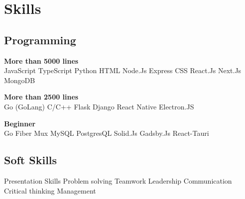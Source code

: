 \documentclass[]{deedy-resume-openfont}
\begin{document}
\begin{minipage}[t]{0.33\textwidth}

\section{Skills}
\subsection{Programming}
\sectionsep
{\bf More than 5000 lines} \\
JavaScript \textbullet{} TypeScript \textbullet{} Python \textbullet{} HTML \textbullet{} Node.Js \textbullet{} Express \textbullet{} CSS \textbullet{} React.Js \textbullet{} Next.Js \textbullet{} MongoDB \\
\sectionsep

{\bf More than 2500 lines} \\
Go (GoLang) \textbullet{} C/C++ \textbullet{} Flask \textbullet{} Django \textbullet{} React Native \textbullet{} Electron.JS \\
\sectionsep

{\bf Beginner} \\
Go Fiber \textbullet{} Mux \textbullet{} MySQL \textbullet{} PostgresQL \textbullet{} Solid.Js \textbullet{} Gadsby.Js \textbullet{} React-Tauri  \\
\sectionsep
\sectionsep

\subsection{Soft Skills}
Presentation Skills \textbullet{} Problem solving \textbullet{} 
Teamwork \textbullet{} Leadership \textbullet{} Communication
\textbullet{} Critical thinking \textbullet{} Management \\

%
%

\end{minipage} 
\hfill
\end{document}
